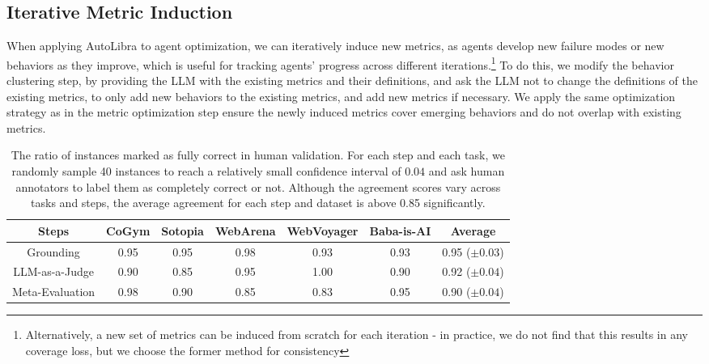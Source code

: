\subsection{Iterative Metric Induction}
\label{sec:iterative-induction} When applying AutoLibra to agent optimization, we
can iteratively induce new metrics, as agents develop new failure modes or new
behaviors as they improve, which is useful for tracking agents' progress across
different iterations.\footnote{Alternatively, a new set of metrics can be induced
from scratch for each iteration - in practice, we do not find that this results
in any coverage loss, but we choose the former method for consistency} To do
this, we modify the behavior clustering step, by providing the LLM with the
existing metrics and their definitions, and ask the LLM not to change the definitions
of the existing metrics, to only add new behaviors to the existing metrics, and add
new metrics if necessary. We apply the same optimization strategy as in the
metric optimization step ensure the newly induced metrics cover emerging
behaviors and do not overlap with existing metrics.
\smallskip

\begin{table}[!h]
	\centering
	\small
	\vspace{-20pt}
	\caption{ The ratio of instances marked as fully correct in human validation.
	For each step and each task, we randomly sample 40 instances to reach a relatively
	small confidence interval of $0.04$ and ask human annotators to label them as completely
	correct or not. Although the agreement scores vary across tasks and steps, the
	average agreement for each step and dataset is above 0.85 significantly. }
	\begin{tabular}{cccccc|c}
		\toprule Steps     & CoGym & Sotopia & WebArena & WebVoyager & Baba-is-AI & Average           \\
		\midrule Grounding & 0.95  & 0.95    & 0.98     & 0.93       & 0.93       & 0.95 ($\pm 0.03$) \\
		LLM-as-a-Judge     & 0.90  & 0.85    & 0.95     & 1.00       & 0.90       & 0.92 ($\pm 0.04$) \\
		Meta-Evaluation    & 0.98  & 0.90    & 0.85     & 0.83       & 0.95       & 0.90 ($\pm 0.04$) \\
		\bottomrule
	\end{tabular}

	\label{tab:validation}
\end{table}

